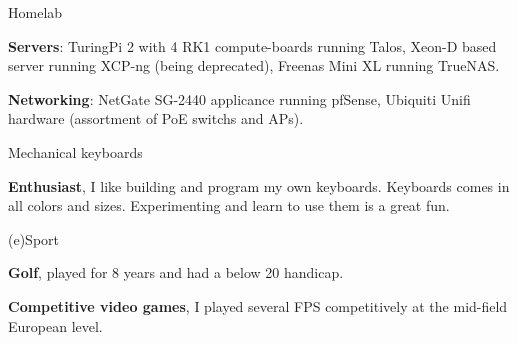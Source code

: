 

\begin{cventries}

  \cventry
    {Homelab} %
    {} %
    {} %
    {} %
    {
      \begin{cvitems} %
        \item {\textbf{Servers}: TuringPi 2 with 4 RK1 compute-boards running Talos, Xeon-D based server running XCP-ng (being deprecated), Freenas Mini XL running TrueNAS.}
        \item {\textbf{Networking}: NetGate SG-2440 applicance running pfSense, Ubiquiti Unifi hardware (assortment of PoE switchs and APs).}
      \end{cvitems}
    }

  \cventry
    {Mechanical keyboards} %
    {} %
    {} %
    {} %
    {
      \begin{cvitems} %
        \item {\textbf{Enthusiast}, I like building and program my own keyboards. Keyboards comes in all colors and sizes. Experimenting and learn to use them is a great fun.}
      \end{cvitems}
    }

  \cventry
    {(e)Sport} %
    {} %
    {} %
    {} %
    {
      \begin{cvitems} %
        \item {\textbf{Golf}, played for 8 years and had a below 20 handicap.}
        \item {\textbf{Competitive video games}, I played several FPS competitively at the mid-field European level.}
      \end{cvitems}
    }

\end{cventries}
